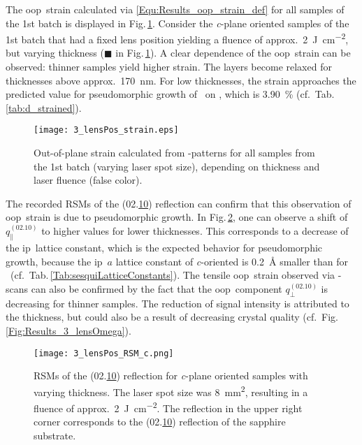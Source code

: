 The \gls{oop}\ strain calculated via \eqref{Equ:Results_oop_strain_def} for all samples of the 1st batch is displayed in Fig.\,\ref{Fig:Results_3_lensStrain}.
Consider the \textit{c}-plane oriented samples of the 1st batch that had a fixed lens position yielding a fluence of approx.\ \qty{2}{\joule\per\cm\squared}, but varying thickness (\textcolor{col-L-2}{$\blacksquare$} in Fig.\,\ref{Fig:Results_3_lensStrain}).
A clear dependence of the \gls{oop}\ strain can be observed: thinner samples yield higher strain.
The layers become relaxed for thicknesses above approx.\ \qty{170}{\nm}.
For low thicknesses, the strain approaches the predicted value for pseudomorphic growth of \cro\ on , which is \qty{3.90}{\percent} (cf.\ Tab.\,\ref{tab:d_strained}).
\begin{figure}
    \centering
    \texttt{[image: 3\_lensPos\_strain.eps]}
    \caption{
        Out-of-plane strain calculated from \thetaomega-patterns for all samples from the 1st batch (varying laser spot size), depending on thickness and laser fluence (false color).
    }
    \label{Fig:Results_3_lensStrain}
\end{figure}
The recorded \glspl{RSM} of the (02.\underline{10}) reflection can confirm that this observation of \gls{oop}\ strain is due to pseudomorphic growth.
In Fig.\,\ref{Fig:Results_3_cRSMs}, one can observe a shift of $q_\parallel^{(02.10)}$ to higher values for lower thicknesses.
This corresponds to a decrease of the \gls{ip}\ lattice constant, which is the expected behavior for pseudomorphic growth, because the \gls{ip}\ $a$ lattice constant of \textit{c}-oriented  is \qty{0.2}{\angstrom} smaller than for \cro\ (cf.\ Tab.\,\ref{Tab:sesquiLatticeConstants}).
The tensile \gls{oop}\ strain observed via \thetaomega-scans can also be confirmed by the fact that the \gls{oop}\ component $q_\perp^{(02.10)}$ is decreasing for thinner samples.
The reduction of signal intensity is attributed to the thickness, but could also be a result of decreasing crystal quality (cf.\ Fig.\,\ref{Fig:Results_3_lensOmega}).
\begin{figure}
    \centering
    \texttt{[image: 3\_lensPos\_RSM\_c.png]}
    \caption{
        \glspl{RSM} of the (02.\underline{10}) reflection for \textit{c}-plane oriented samples with varying thickness.
        The laser spot size was \qty{8}{\mm\squared}, resulting in a fluence of approx.\ \qty{2}{\J\per\cm\squared}.
        The reflection in the upper right corner corresponds to the (02.\underline{10}) reflection of the sapphire substrate.
    }
    \label{Fig:Results_3_cRSMs}
\end{figure}
